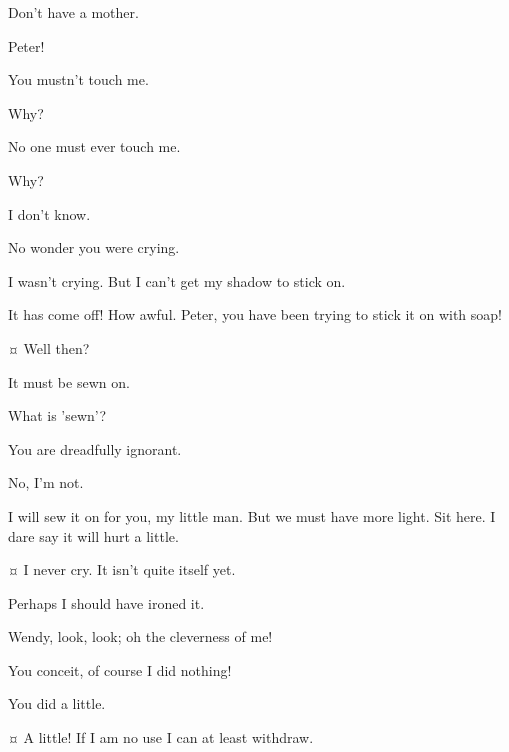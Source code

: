\begin{drama}
\peterspeaks
Don't have a mother.

\wendyspeaks
Peter!


\peterspeaks
You mustn't touch me.

\wendyspeaks
Why?

\peterspeaks
No one must ever touch me.

\wendyspeaks
Why?

\peterspeaks
I don't know.


\wendyspeaks
No wonder you were crying.

\peterspeaks
I wasn't crying.
But I can't get my shadow to stick on.

\wendyspeaks
It has come off!
How awful.
Peter, you have been trying to stick it on with soap!

\peterspeaks {}¤
Well then?

\wendyspeaks
It must be sewn on.

\peterspeaks
What is 'sewn'?

\wendyspeaks
You are dreadfully ignorant.

\peterspeaks
No, I'm not.

\wendyspeaks
I will sew it on for you, my little man.
But we must have more light.
Sit here.
I dare say it will hurt a little.

\peterspeaks {}¤
I never cry.
It isn't quite itself yet.

\wendyspeaks
Perhaps I should have ironed it.

\peterspeaks
Wendy, look, look; oh the cleverness of me!

\wendyspeaks
You conceit, of course I did nothing!

\peterspeaks
You did a little.

\wendyspeaks {}¤
A little!
If I am no use I can at least withdraw.


\end{drama}
